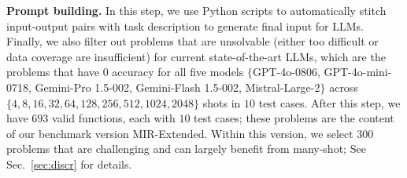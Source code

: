 \textbf{Prompt building.} In this step, we use Python scripts to automatically stitch input-output pairs with task description to generate final input for LLMs. Finally, we also filter out problems that are unsolvable (either too difficult or data coverage are insufficient) for current state-of-the-art LLMs, which are the problems that have $0$ accuracy for all five models $\{$GPT-4o-0806, GPT-4o-mini-0718, Gemini-Pro 1.5-002, Gemini-Flash 1.5-002, Mistral-Large-2$\}$ across $\{4, 8, 16, 32, 64, 128, 256, 512, 1024, 2048\}$ shots in $10$ test cases. After this step, we have $693$ valid functions, each with $10$ test cases; these problems are the content of our benchmark version MIR-Extended. Within this version, we select $300$ problems that are challenging and can largely benefit from many-shot; See Sec.~\ref{sec:discr} for details. 





